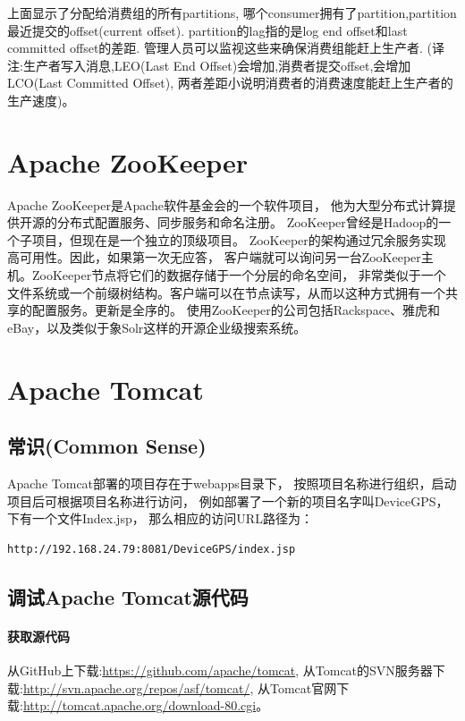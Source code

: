 \documentclass{book}
\begin{document}
上面显示了分配给消费组的所有partitions,
哪个consumer拥有了partition,partition最近提交的offset(current offset).
partition的lag指的是log end offset和last committed offset的差距. 管理人员可以监视这些来确保消费组能赶上生产者.
(译注:生产者写入消息,LEO(Last End Offset)会增加,消费者提交offset,会增加LCO(Last Committed Offset),
两者差距小说明消费者的消费速度能赶上生产者的生产速度)。

\section{Apache ZooKeeper}

Apache ZooKeeper是Apache软件基金会的一个软件项目，
他为大型分布式计算提供开源的分布式配置服务、同步服务和命名注册。
ZooKeeper曾经是Hadoop的一个子项目，但现在是一个独立的顶级项目。
ZooKeeper的架构通过冗余服务实现高可用性。因此，如果第一次无应答，
客户端就可以询问另一台ZooKeeper主机。ZooKeeper节点将它们的数据存储于一个分层的命名空间，
非常类似于一个文件系统或一个前缀树结构。客户端可以在节点读写，从而以这种方式拥有一个共享的配置服务。更新是全序的。
使用ZooKeeper的公司包括Rackspace、雅虎和eBay，以及类似于象Solr这样的开源企业级搜索系统。

\section{Apache Tomcat}

\subsection{常识(Common Sense)}

Apache Tomcat部署的项目存在于webapps目录下，
按照项目名称进行组织，启动项目后可根据项目名称进行访问，
例如部署了一个新的项目名字叫DeviceGPS，下有一个文件Index.jsp，
那么相应的访问URL路径为：

\begin{lstlisting}[language=HTML]
http://192.168.24.79:8081/DeviceGPS/index.jsp
\end{lstlisting}

\subsection{调试Apache Tomcat源代码}

\paragraph{获取源代码}

从GitHub上下载:\url{https://github.com/apache/tomcat},
从Tomcat的SVN服务器下载:\url{http://svn.apache.org/repos/asf/tomcat/},
从Tomcat官网下载:\url{http://tomcat.apache.org/download-80.cgi}。
\end{document}
